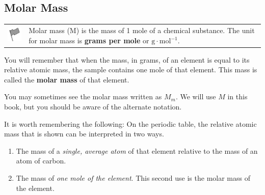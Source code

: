             \subsection{ Molar Mass}
            \nopagebreak
\par
            \label{m38717*fhsst!!!underscore!!!id147}\begin{definition}
	  \begin{tabular*}{15 cm}{m{15 mm}m{}}
	\hspace*{-50pt}  \includegraphics[width=0.5in]{col11305.imgs/psflag2.png}   & \Definition{   \label{id2496969}\textbf{ Molar mass }} { \label{m38717*meaningfhsst!!!underscore!!!id147}
      \label{m38717*id276397}Molar mass (M) is the mass of 1 mole of a chemical substance. The unit for molar mass is \textbf{grams per mole} or $\mathrm{g}\ensuremath{\cdot}\mathrm{mol}{}^{-1}$. \par 
       } 
      \end{tabular*}
      \end{definition}
      \label{m38717*id276429}You will remember that when the mass, in grams, of an element is equal to its relative atomic mass, the sample contains one mole of that element. This mass is called the \textbf{molar mass} of that element.\par 
      \label{m38717*eip-277}You may sometimes see the molar mass written as ${M}_{m}$. We will use $M$ in this book, but you should be aware of the alternate notation.\par \label{m38717*id276445}It is worth remembering the following: On the periodic table, the relative atomic mass that is shown can be interpreted in two ways.\par 
      \label{m38717*id276451}\begin{enumerate}[noitemsep, label=\textbf{\arabic*}. ] 
            \label{m38717*uid9}\item The mass of a \textsl{single, average atom} of that element relative to the mass of an atom of carbon.
\label{m38717*uid10}\item The mass of \textsl{one mole of the element}. This second use is the molar mass of the element.
\end{enumerate}
